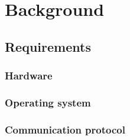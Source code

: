 \section{Background}

%	
\subsection{Requirements}

\subsubsection{Hardware}

\subsubsection{Operating system}

\subsubsection{Communication protocol}

